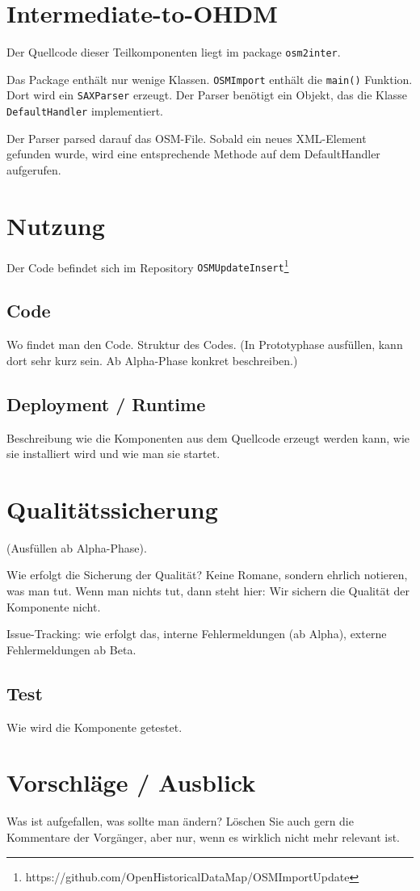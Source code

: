 

\section{Intermediate-to-OHDM}
Der Quellcode dieser Teilkomponenten liegt im package {\tt osm2inter}.

Das Package enthält nur wenige Klassen. {\tt OSMImport} enthält die {\tt main()}
Funktion. Dort wird ein {\tt SAXParser} erzeugt. Der Parser benötigt ein
Objekt, das die Klasse {\tt DefaultHandler} implementiert.

Der Parser parsed darauf das OSM-File. Sobald ein neues XML-Element gefunden wurde,
wird eine entsprechende Methode auf dem DefaultHandler aufgerufen. 

\section{Nutzung}
Der Code befindet sich im Repository {\tt OSMUpdateInsert}\footnote{https://github.com/OpenHistoricalDataMap/OSMImportUpdate}
\subsection{Code}
Wo findet man den Code. Struktur des Codes. (In Prototyphase ausfüllen,
kann dort sehr kurz sein. Ab Alpha-Phase konkret beschreiben.)

\subsection{Deployment / Runtime}
Beschreibung wie die Komponenten aus dem Quellcode erzeugt werden kann,
wie sie installiert wird und wie man sie startet.

\section{Qualitätssicherung}
(Ausfüllen ab Alpha-Phase).

Wie erfolgt die Sicherung der Qualität? Keine Romane, sondern ehrlich notieren,
was man tut. Wenn man nichts tut, dann steht hier: Wir sichern die Qualität der
Komponente nicht.

Issue-Tracking: wie erfolgt das, interne Fehlermeldungen (ab Alpha), 
externe Fehlermeldungen ab Beta.

\subsection{Test}
Wie wird die Komponente getestet.

\section{Vorschläge / Ausblick}
Was ist aufgefallen, was sollte man ändern? Löschen Sie auch gern die Kommentare
der Vorgänger, aber nur, wenn es wirklich nicht mehr relevant ist.

